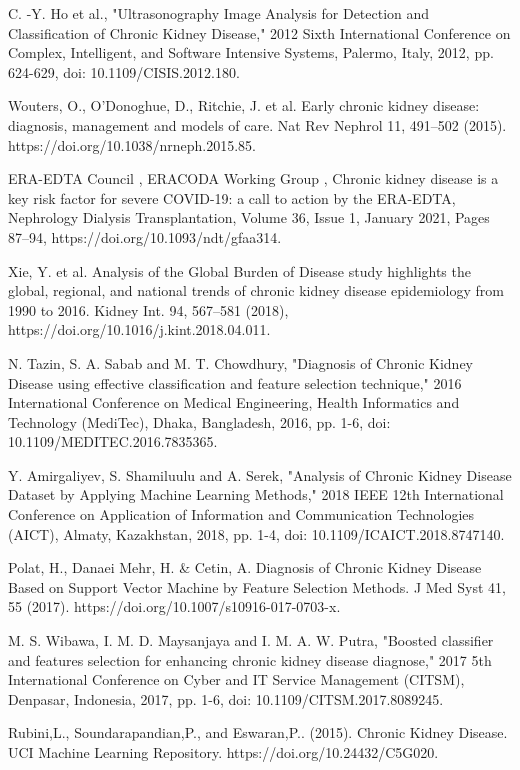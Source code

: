 \documentclass[conference]{IEEEtran}
\begin{document}
%
%
%
% 
% 
%

\begin{thebibliography}{14}
C. -Y. Ho et al., "Ultrasonography Image Analysis for Detection and Classification of Chronic Kidney Disease," 2012 Sixth International Conference on Complex, Intelligent, and Software Intensive Systems, Palermo, Italy, 2012, pp. 624-629, doi: 10.1109/CISIS.2012.180.

Wouters, O., O'Donoghue, D., Ritchie, J. et al. Early chronic kidney disease: diagnosis, management and models of care. Nat Rev Nephrol 11, 491–502 (2015). https://doi.org/10.1038/nrneph.2015.85.

ERA-EDTA Council , ERACODA Working Group , Chronic kidney disease is a key risk factor for severe COVID-19: a call to action by the ERA-EDTA, Nephrology Dialysis Transplantation, Volume 36, Issue 1, January 2021, Pages 87–94, https://doi.org/10.1093/ndt/gfaa314. 

Xie, Y. et al. Analysis of the Global Burden of Disease study highlights the global, regional, and national trends of chronic kidney disease epidemiology from 1990 to 2016. Kidney Int. 94, 567–581 (2018), https://doi.org/10.1016/j.kint.2018.04.011.

N. Tazin, S. A. Sabab and M. T. Chowdhury, "Diagnosis of Chronic Kidney Disease using effective classification and feature selection technique," 2016 International Conference on Medical Engineering, Health Informatics and Technology (MediTec), Dhaka, Bangladesh, 2016, pp. 1-6, doi: 10.1109/MEDITEC.2016.7835365.

Y. Amirgaliyev, S. Shamiluulu and A. Serek, "Analysis of Chronic Kidney Disease Dataset by Applying Machine Learning Methods," 2018 IEEE 12th International Conference on Application of Information and Communication Technologies (AICT), Almaty, Kazakhstan, 2018, pp. 1-4, doi: 10.1109/ICAICT.2018.8747140.

Polat, H., Danaei Mehr, H. \& Cetin, A. Diagnosis of Chronic Kidney Disease Based on Support Vector Machine by Feature Selection Methods. J Med Syst 41, 55 (2017). https://doi.org/10.1007/s10916-017-0703-x.

M. S. Wibawa, I. M. D. Maysanjaya and I. M. A. W. Putra, "Boosted classifier and features selection for enhancing chronic kidney disease diagnose," 2017 5th International Conference on Cyber and IT Service Management (CITSM), Denpasar, Indonesia, 2017, pp. 1-6, doi: 10.1109/CITSM.2017.8089245.

Rubini,L., Soundarapandian,P., and Eswaran,P.. (2015). Chronic Kidney Disease. UCI Machine Learning Repository. https://doi.org/10.24432/C5G020.

\end{thebibliography}
\end{document}
